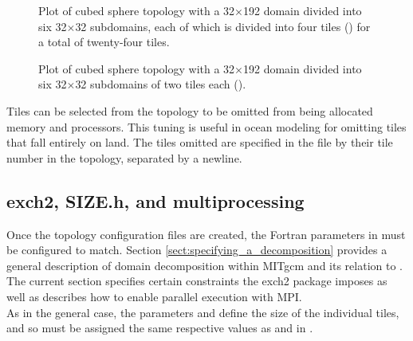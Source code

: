 \begin{figure}
\begin{center}
\end{center} 

\caption{Plot of cubed sphere topology with a 32$\times$192 domain
divided into six 32$\times$32 subdomains, each of which is divided into four tiles 
() for a total of twenty-four tiles.
} \label{fig:24tile}
\end{figure}

\begin{figure}
\begin{center}
\end{center} 
\caption{Plot of cubed sphere topology with a 32$\times$192 domain
divided into six 32$\times$32 subdomains of two tiles each
 ().
} \label{fig:12tile}
\end{figure}

Tiles can be selected from the topology to be omitted from being
allocated memory and processors.  This tuning is useful in ocean
modeling for omitting tiles that fall entirely on land.  The tiles
omitted are specified in the file
by their tile number in the topology, separated by a newline. \\




\subsection{exch2, SIZE.h, and multiprocessing}
\label{sec:exch2mpi}

Once the topology configuration files are created, the Fortran
parameters in  must be configured to match.  Section
\ref{sect:specifying_a_decomposition}  provides a general description of domain decomposition
within MITgcm and its relation to . The current section
specifies certain constraints the exch2 package imposes as well as
describes how to enable parallel execution with MPI. \\

As in the general case, the parameters  and
 define the size of the individual tiles, and so
must be assigned the same respective values as  and
 in .\\

